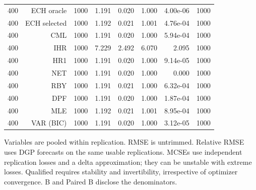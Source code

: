 \begin{table}[p]
\begin{tabular}{rrrrrrrr}
400 & ECH oracle & 1000 & 1.191 & 0.020 & 1.000 & 4.00e-06 & 1000 \\
400 & ECH selected & 1000 & 1.192 & 0.021 & 1.001 & 4.76e-04 & 1000 \\
400 & CML & 1000 & 1.191 & 0.020 & 1.000 & 5.94e-04 & 1000 \\
400 & IHR & 1000 & 7.229 & 2.492 & 6.070 & 2.095 & 1000 \\
400 & HR1 & 1000 & 1.191 & 0.020 & 1.000 & 9.14e-05 & 1000 \\
400 & NET & 1000 & 1.191 & 0.020 & 1.000 & 0.000 & 1000 \\
400 & RBY & 1000 & 1.191 & 0.021 & 1.000 & 6.32e-04 & 1000 \\
400 & DPF & 1000 & 1.191 & 0.020 & 1.000 & 1.87e-04 & 1000 \\
400 & MLE & 1000 & 1.192 & 0.021 & 1.001 & 8.95e-04 & 1000 \\
400 & VAR (BIC) & 1000 & 1.191 & 0.020 & 1.000 & 3.12e-05 & 1000 \\
\bottomrule\end{tabular}
\par\medskip
\begin{minipage}{0.98\linewidth}\footnotesize Variables are pooled within replication. RMSE is untrimmed. Relative RMSE uses DGP forecasts on the same usable replications. MCSEs use independent replication losses and a delta approximation; they can be unstable with extreme losses. Qualified requires stability and invertibility, irrespective of optimizer convergence. B and Paired B disclose the denominators.\end{minipage}
\end{table}
